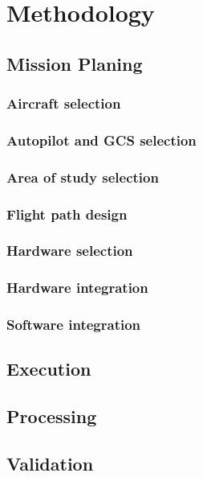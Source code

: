\section{Methodology}
\subsection{Mission Planing}
\subsubsection{Aircraft selection}
\subsubsection{Autopilot and GCS selection}
\subsubsection{Area of study selection}
\subsubsection{Flight path design}
\subsubsection{Hardware selection}
\subsubsection{Hardware integration}
\subsubsection{Software integration}
\subsection{Execution}
\subsection{Processing}
\subsection{Validation}